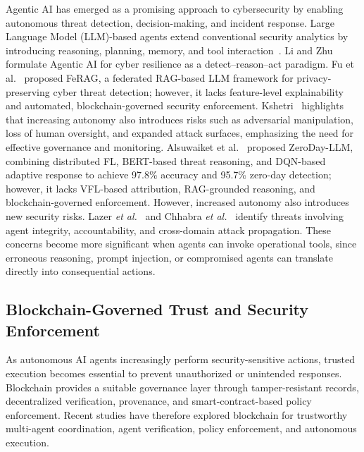 \documentclass[10pt, conference]{IEEEtran}
\begin{document}
Agentic AI has emerged as a promising approach to cybersecurity by enabling autonomous threat detection, decision-making, and incident response. Large Language Model (LLM)-based agents extend conventional security
analytics by introducing reasoning, planning, memory, and tool
interaction~\cite{xi2023}. Li and Zhu~\cite{li2025} formulate Agentic AI for cyber resilience as a detect--reason--act paradigm.
 Fu et al.~\cite{fu2026} proposed FeRAG, a federated RAG-based LLM framework for privacy-preserving cyber threat detection; however, it lacks feature-level explainability and automated, blockchain-governed security enforcement. Kshetri~\cite{kshetri2025agentic} highlights that increasing autonomy also introduces risks such as adversarial manipulation, loss of human oversight, and expanded attack surfaces, emphasizing the need for effective governance and monitoring.
Alsuwaiket et al.~\cite{alsuwaiket2024} proposed ZeroDay-LLM, combining distributed FL, BERT-based threat reasoning, and DQN-based adaptive response to achieve 97.8\% accuracy and 95.7\% zero-day detection; however, it lacks VFL-based attribution, RAG-grounded reasoning, and blockchain-governed enforcement.
However, increased autonomy also introduces new security risks. Lazer \emph{et al.}~\cite{lazer2026} and Chhabra \emph{et al.}~\cite{chhabra2026} identify threats involving agent integrity, accountability, and cross-domain attack propagation. These concerns become more significant when agents can invoke operational tools, since erroneous reasoning, prompt injection, or compromised
agents can translate directly into consequential actions.


\subsection{Blockchain-Governed Trust and Security Enforcement}

As autonomous AI agents increasingly perform security-sensitive actions, trusted execution becomes essential to prevent unauthorized or unintended responses. Blockchain provides a suitable governance layer through tamper-resistant records, decentralized verification, provenance, and smart-contract-based policy enforcement. Recent studies have therefore explored blockchain for trustworthy multi-agent coordination, agent verification, policy enforcement, and autonomous execution.
\end{document}

